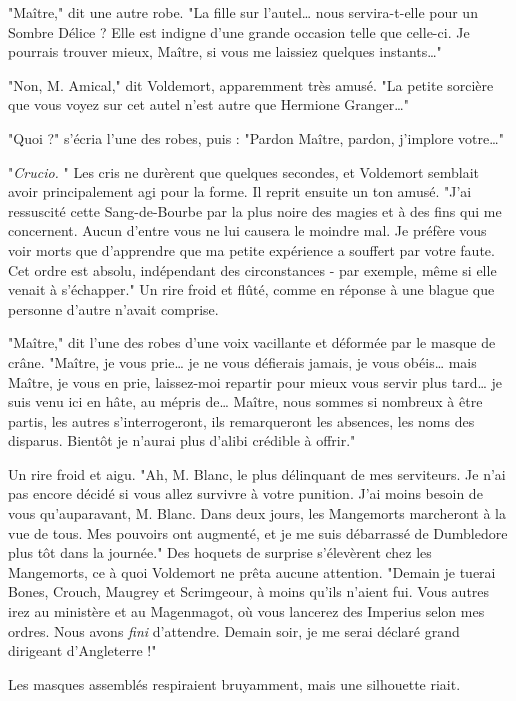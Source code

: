 "Maître," dit une autre robe. "La fille sur l'autel… nous servira-t-elle pour un Sombre Délice ? Elle est indigne d'une grande occasion telle que celle-ci. Je pourrais trouver mieux, Maître, si vous me laissiez quelques instants…"

"Non, M. Amical," dit Voldemort, apparemment très amusé. "La petite sorcière que vous voyez sur cet autel n'est autre que Hermione Granger…"

"Quoi ?" s'écria l'une des robes, puis : "Pardon Maître, pardon, j'implore votre…"

"\emph{Crucio.} " Les cris ne durèrent que quelques secondes, et Voldemort semblait avoir principalement agi pour la forme. Il reprit ensuite un ton amusé. "J'ai ressuscité cette Sang-de-Bourbe par la plus noire des magies et à des fins qui me concernent. Aucun d'entre vous ne lui causera le moindre mal. Je préfère vous voir morts que d'apprendre que ma petite expérience a souffert par votre faute. Cet ordre est absolu, indépendant des circonstances - par exemple, même si elle venait à s'échapper." Un rire froid et flûté, comme en réponse à une blague que personne d'autre n'avait comprise.

"Maître," dit l'une des robes d'une voix vacillante et déformée par le masque de crâne. "Maître, je vous prie… je ne vous défierais jamais, je vous obéis… mais Maître, je vous en prie, laissez-moi repartir pour mieux vous servir plus tard… je suis venu ici en hâte, au mépris de… Maître, nous sommes si nombreux à être partis, les autres s'interrogeront, ils remarqueront les absences, les noms des disparus. Bientôt je n'aurai plus d'alibi crédible à offrir."

Un rire froid et aigu. "Ah, M. Blanc, le plus délinquant de mes serviteurs. Je n'ai pas encore décidé si vous allez survivre à votre punition. J'ai moins besoin de vous qu'auparavant, M. Blanc. Dans deux jours, les Mangemorts marcheront à la vue de tous. Mes pouvoirs ont augmenté, et je me suis débarrassé de Dumbledore plus tôt dans la journée." Des hoquets de surprise s'élevèrent chez les Mangemorts, ce à quoi Voldemort ne prêta aucune attention. "Demain je tuerai Bones, Crouch, Maugrey et Scrimgeour, à moins qu'ils n'aient fui. Vous autres irez au ministère et au Magenmagot, où vous lancerez des Imperius selon mes ordres. Nous avons \emph{fini}  d'attendre. Demain soir, je me serai déclaré grand dirigeant d'Angleterre !"

Les masques assemblés respiraient bruyamment, mais une silhouette riait.

